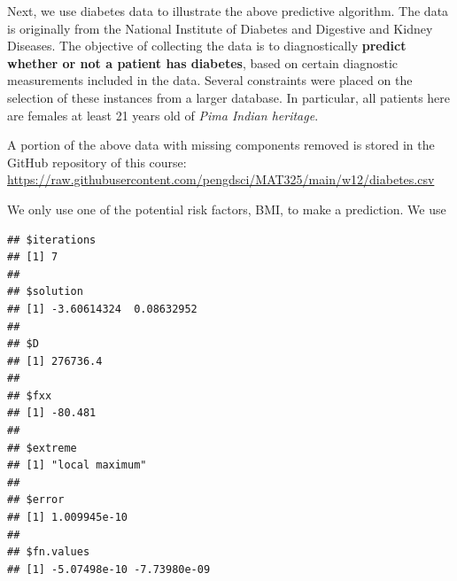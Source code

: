 \documentclass[
]{book}
\newenvironment{Shaded}{\begin{snugshade}}{\end{snugshade}}
\newcommand{\AttributeTok}[1]{\textcolor[rgb]{0.13,0.29,0.53}{#1}}
\newcommand{\CommentTok}[1]{\textcolor[rgb]{0.56,0.35,0.01}{\textit{#1}}}
\newcommand{\ConstantTok}[1]{\textcolor[rgb]{0.56,0.35,0.01}{#1}}
\newcommand{\DecValTok}[1]{\textcolor[rgb]{0.00,0.00,0.81}{#1}}
\newcommand{\FunctionTok}[1]{\textcolor[rgb]{0.13,0.29,0.53}{\textbf{#1}}}
\newcommand{\NormalTok}[1]{#1}
\newcommand{\OtherTok}[1]{\textcolor[rgb]{0.56,0.35,0.01}{#1}}
\newcommand{\SpecialCharTok}[1]{\textcolor[rgb]{0.81,0.36,0.00}{\textbf{#1}}}
\newcommand{\StringTok}[1]{\textcolor[rgb]{0.31,0.60,0.02}{#1}}
\begin{document}
Next, we use diabetes data to illustrate the above predictive algorithm. The data is originally from the National Institute of Diabetes and Digestive and Kidney Diseases. The objective of collecting the data is to diagnostically \textbf{predict whether or not a patient has diabetes}, based on certain diagnostic measurements included in the data. Several constraints were placed on the selection of these instances from a larger database. In particular, all patients here are females at least 21 years old of \emph{Pima Indian heritage}.

A portion of the above data with missing components removed is stored in the GitHub repository of this course: \url{https://raw.githubusercontent.com/pengdsci/MAT325/main/w12/diabetes.csv}

\hfill\break

We only use one of the potential risk factors, BMI, to make a prediction. We use

\begin{Shaded}
\end{Shaded}

\begin{verbatim}
## $iterations
## [1] 7
## 
## $solution
## [1] -3.60614324  0.08632952
## 
## $D
## [1] 276736.4
## 
## $fxx
## [1] -80.481
## 
## $extreme
## [1] "local maximum"
## 
## $error
## [1] 1.009945e-10
## 
## $fn.values
## [1] -5.07498e-10 -7.73980e-09
\end{verbatim}
\end{document}
